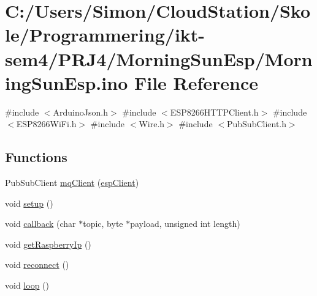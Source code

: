 \hypertarget{_morning_sun_esp_8ino}{}\section{C\+:/\+Users/\+Simon/\+Cloud\+Station/\+Skole/\+Programmering/ikt-\/sem4/\+P\+R\+J4/\+Morning\+Sun\+Esp/\+Morning\+Sun\+Esp.ino File Reference}
\label{_morning_sun_esp_8ino}
{\ttfamily \#include $<$Arduino\+Json.\+h$>$}\newline
{\ttfamily \#include $<$E\+S\+P8266\+H\+T\+T\+P\+Client.\+h$>$}\newline
{\ttfamily \#include $<$E\+S\+P8266\+Wi\+Fi.\+h$>$}\newline
{\ttfamily \#include $<$Wire.\+h$>$}\newline
{\ttfamily \#include $<$Pub\+Sub\+Client.\+h$>$}\newline
\subsection*{Functions}
\begin{DoxyCompactItemize}
\item 
Pub\+Sub\+Client \mbox{\hyperlink{_morning_sun_esp_8ino_a3723ecd4627fe1acd7f94dd266f1105a}{mq\+Client}} (\mbox{\hyperlink{_snap_box_8ino_abd77e757e4b3bb6f1e4b42b21ea9e040}{esp\+Client}})
\item 
void \mbox{\hyperlink{_morning_sun_esp_8ino_a4fc01d736fe50cf5b977f755b675f11d}{setup}} ()
\item 
void \mbox{\hyperlink{_morning_sun_esp_8ino_ac3a129f66dc859e2b7279565f4e1de78}{callback}} (char $\ast$topic, byte $\ast$payload, unsigned int length)
\item 
void \mbox{\hyperlink{_morning_sun_esp_8ino_a7a69432900bad935bd00eb0a9d4bf61f}{get\+Raspberry\+Ip}} ()
\item 
void \mbox{\hyperlink{_morning_sun_esp_8ino_a4bcd6ce7d04c38f8c4ff908d1fc50f86}{reconnect}} ()
\item 
void \mbox{\hyperlink{_morning_sun_esp_8ino_afe461d27b9c48d5921c00d521181f12f}{loop}} ()
\end{DoxyCompactItemize}
